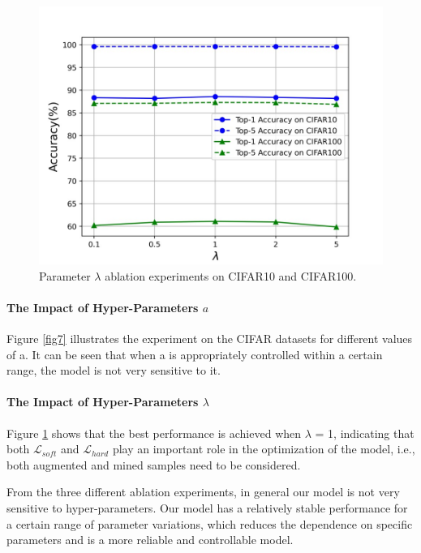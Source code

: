 \documentclass[review]{elsarticle}
\begin{document}
\begin{figure}[!t]
\centering
\includegraphics[scale=0.35]{figure9.jpg}
\caption{Parameter $\lambda$ ablation experiments on CIFAR10 and CIFAR100. }
\label{fig8}
\end{figure}


\paragraph{The Impact of Hyper-Parameters $a$}
Figure \ref{fig7} illustrates the experiment on the CIFAR datasets for different values of a. It can be seen that when a is  appropriately controlled within a certain range, the model is not very sensitive to it.

\paragraph{The Impact of Hyper-Parameters $\lambda$}
Figure \ref{fig8} shows that the best performance is achieved when $\lambda$ = 1, indicating that both $\mathcal{L} _{soft}$ and  $\mathcal{L} _{hard}$ play an important role in the optimization of the model, i.e., both augmented and mined samples need to be considered.


From the three different ablation experiments, in general our model is not very sensitive to hyper-parameters.  Our model has a relatively stable performance for a certain range of parameter variations, which reduces the dependence on specific parameters and is a more reliable and controllable model.
\end{document}
